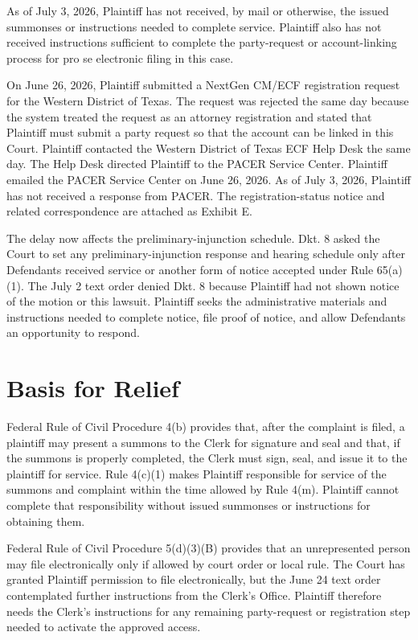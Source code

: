 \documentclass[12pt]{article}
\begin{document}
As of July 3, 2026, Plaintiff has not received, by mail or otherwise, the issued summonses or instructions needed to complete service. Plaintiff also has not received instructions sufficient to complete the party-request or account-linking process for pro se electronic filing in this case.

On June 26, 2026, Plaintiff submitted a NextGen CM/ECF registration request for the Western District of Texas. The request was rejected the same day because the system treated the request as an attorney registration and stated that Plaintiff must submit a party request so that the account can be linked in this Court. Plaintiff contacted the Western District of Texas ECF Help Desk the same day. The Help Desk directed Plaintiff to the PACER Service Center. Plaintiff emailed the PACER Service Center on June 26, 2026. As of July 3, 2026, Plaintiff has not received a response from PACER. The registration-status notice and related correspondence are attached as Exhibit E.

The delay now affects the preliminary-injunction schedule. Dkt. 8 asked the Court to set any preliminary-injunction response and hearing schedule only after Defendants received service or another form of notice accepted under Rule 65(a)(1). The July 2 text order denied Dkt. 8 because Plaintiff had not shown notice of the motion or this lawsuit. Plaintiff seeks the administrative materials and instructions needed to complete notice, file proof of notice, and allow Defendants an opportunity to respond.

\section*{Basis for Relief}

Federal Rule of Civil Procedure 4(b) provides that, after the complaint is filed, a plaintiff may present a summons to the Clerk for signature and seal and that, if the summons is properly completed, the Clerk must sign, seal, and issue it to the plaintiff for service. Rule 4(c)(1) makes Plaintiff responsible for service of the summons and complaint within the time allowed by Rule 4(m). Plaintiff cannot complete that responsibility without issued summonses or instructions for obtaining them.

Federal Rule of Civil Procedure 5(d)(3)(B) provides that an unrepresented person may file electronically only if allowed by court order or local rule. The Court has granted Plaintiff permission to file electronically, but the June 24 text order contemplated further instructions from the Clerk's Office. Plaintiff therefore needs the Clerk's instructions for any remaining party-request or registration step needed to activate the approved access.
\end{document}
